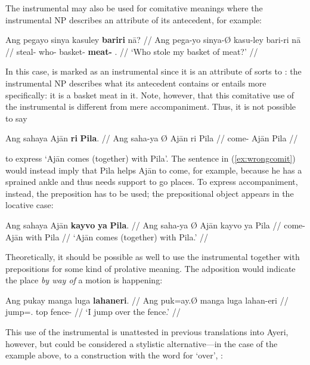 \xe

The instrumental may also be used for comitative meanings where the 
instrumental NP describes an attribute of its antecedent, for example:

\ex\begingl
	\gla Ang pegayo sinya kasuley \textbf{bariri} nā? //
	\glb Ang pega-yo sinya-Ø kasu-ley bari-ri nā //
	\glc \AgtT{} steal-\TsgN{} who-\Top{} basket-\PargI{} 
		\textbf{meat-\Ins{}} \Fsg{}.\Gen{} //
	\glft `Who stole my basket of meat?' //
\endgl\xe

In this case,  is marked as an instrumental since it is an 
attribute of sorts to : the instrumental NP describes what its 
antecedent contains or entails more specifically: it is a basket  meat 
in it. Note, however, that this comitative use of the instrumental is different 
from mere accompaniment. Thus, it is not possible to say

\ex\label{ex:wrongcomit}\ljudge* \begingl
	\gla Ang sahaya {} Ajān \textbf{ri} \textbf{Pila}. //
	\glb Ang saha-ya Ø Ajān ri Pila //
	\glc \AgtT{} come-\TsgM{} \Top{} Ajān \Ins{} Pila //
\endgl\xe

\noindent to express `Ajān comes (together) with Pila'. The sentence in 
(\ref{ex:wrongcomit}) would instead imply that Pila helps Ajān to come, for 
example, because he has a sprained ankle and thus needs support to go places. 
To express accompaniment, instead, the preposition  has to be used; the prepositional object appears in the locative 
case:

\ex\begingl
	\gla Ang sahaya {} Ajān \textbf{kayvo} \textbf{ya} \textbf{Pila}. //
	\glb Ang saha-ya Ø Ajān kayvo ya Pila //
	\glc \AgtT{} come-\TsgM{} \Top{} Ajān with \Loc{} Pila //
	\glft `Ajān comes (together) with Pila.' //
\endgl\xe

Theoretically, it should be possible as well to use the instrumental together 
with prepositions for some kind of prolative meaning. The adposition would 
indicate the place \emph{by way of} a motion is happening:

\ex\begingl
	\gla Ang pukay manga luga \textbf{lahaneri}. //
	\glb Ang puk=ay.Ø manga luga lahan-eri //
	\glc \AgtT{} jump=\Fsg{}.\Top{} \Dyn{} top fence-\Ins{} //
	\glft `I jump over the fence.' //
\endgl\xe

This use of the instrumental is unattested in previous translations into Ayeri, 
however, but could be considered a stylistic alternative---in the case of the 
example above, to a construction with the word for `over', 
:

